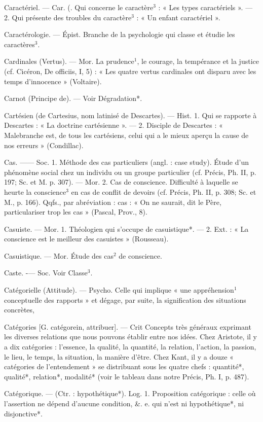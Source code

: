 Caractériel. — Car. (. Qui concerne le
caractère$^3$ : « Les types caractériels ». — 2. Qui présente des troubles
du caractère$^3$ : « Un enfant caractériel ».

Caractérologie. — Épist. Branche de la
psychologie qui classe et étudie les
caractères$^3$.

Cardinales (Vertus). — Mor. La prudence$^1$, le courage, la tempérance
et la justice (cf. Cicéron, De officiis,
I, 5) : « Les quatre vertus cardinales
ont disparu avec les temps d’innocence » (Voltaire).

Carnot (Principe de). — Voir Dégradation*.

Cartésien (de Cartesius, nom latinisé
de Descartes). — Hist. 1. Qui se
rapporte à Descartes : « La doctrine
cartésienne ». — 2. Disciple de Descartes : « Malebranche est, de tous
les cartésiens, celui qui a le mieux
aperçu la cause de nos erreurs »
(Condillac).

Cas. —— Soc. 1. Méthode des cas particuliers (angl. : case study). Étude
d’un phénomène social chez un individu ou un groupe particulier (cf.
Précis, Ph. II, p. 197; Sc. et M.
p. 307). — Mor. 2. Cas de conscience.
Difficulté à laquelle se heurte la
conscience$^3$ en cas de conflit de
devoirs (cf. Précis, Ph. II, p. 308;
Sc. et M., p. 166). Qqfs., par abréviation : cas : « On ne saurait, dit le
Père, particulariser trop les cas »
(Pascal, Prov., 8).

Casuiste. — Mor. 1. Théologien qui
s'occupe de casuistique*. — 2. Ext. :
« La conscience est le meilleur des
casuistes » (Rousseau).

Casuistique. — Mor. Étude des cas$^2$
de conscience.

Caste. -— Soc. Voir Classe$^3$.

Catégorielle (Attitude). — Psycho.
Celle qui implique « une appréhension$^1$ conceptuelle des rapports » et
dégage, par suite, la signification
des situations concrètes,

Catégories [G. catégorein, attribuer].
— Crit Concepts très généraux
exprimant les diverses relations que
nous pouvons établir entre nos idées.
Chez Aristote, il y a dix catégories :
l'essence, la qualité, la quantité, la
relation, l’action, la passion, le lieu,
le temps, la situation, la manière
d’être. Chez Kant, il y a douze « catégories de l’entendement » se distribuant sous les quatre chefs : quantité*, qualité*, relation*, modalité*
(voir le tableau dans notre Précis,
Ph. I, p. 487).

Catégorique. — (Ctr. : hypothétique*).
Log. 1. Proposition catégorique :
celle où l’assertion ne dépend d’aucune condition, &. e. qui n’est ni
hypothétique*, ni disjonctive*.

